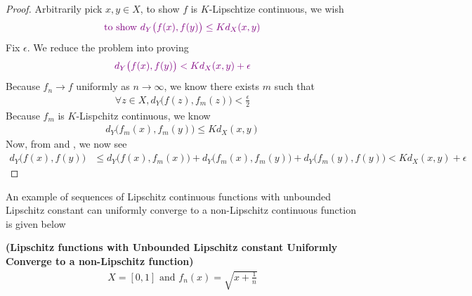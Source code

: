 \documentclass{report}
\begin{document}
\begin{proof}
Arbitrarily pick $x,y \in X$, to show $f$ is $K$-Lipschtize continuous, we wish 
\begin{align*}
\textcolor{violet}{\text{ to show $d_Y\big(f(x),f(y) \big)\leq Kd_X(x,y)$ }}
\end{align*}
Fix $\epsilon $. We reduce the problem into proving 
\begin{align*}
  \textcolor{violet}{d_Y\big(f(x),f(y) \big)<Kd_X(x,y)+\epsilon }
\end{align*}
Because $f_n\to f$ uniformly as $n\to \infty$, we know there exists $m$ such that 
 \begin{align}
\label{L4}
\forall z \in X, d_Y\big(f(z),f_m(z) \big)<\frac{\epsilon}{2}
\end{align}
Because $f_m$ is $K$-Lispchitz continuous, we know 
\begin{align}
\label{L3}
d_Y\big(f_m(x),f_m(y) \big)\leq Kd_X(x,y)
\end{align}
Now, from  and , we now see 
\begin{align*}
  d_Y\big(f(x),f(y) \big)&\leq d_Y\big(f(x),f_m(x) \big)+d_Y\big(f_m(x),f_m(y) \big)+d_Y\big(f_m(y),f(y) \big)< Kd_X(x,y)+\epsilon 
\end{align*}
\end{proof}
\begin{mdframed}
An example of sequences of Lipschitz continuous functions with unbounded Lipschitz constant can uniformly converge to a non-Lipschitz continuous function is given below 
\begin{Example}{\textbf{(Lipschitz functions with Unbounded Lipschitz constant Uniformly Converge to a non-Lipschitz function)}}{}
\begin{align*}
X=[0,1]\text{ and }f_n(x)=\sqrt{x+\frac{1}{n}} 
\end{align*}
\end{Example}
\end{mdframed}
\end{document}
